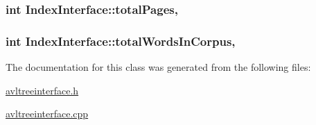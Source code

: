 \subsubsection[{total\+Pages}]{\setlength{\rightskip}{0pt plus 5cm}int Index\+Interface\+::total\+Pages\hspace{0.3cm}{\ttfamily [protected]}, {\ttfamily [inherited]}}\label{class_index_interface_a2df695d2b504f2e53a0bfdd6bfee31da}
\hypertarget{class_index_interface_ab607b430e78528cdb8bb79ba4afa91d2}{}
\subsubsection[{total\+Words\+In\+Corpus}]{\setlength{\rightskip}{0pt plus 5cm}int Index\+Interface\+::total\+Words\+In\+Corpus\hspace{0.3cm}{\ttfamily [protected]}, {\ttfamily [inherited]}}\label{class_index_interface_ab607b430e78528cdb8bb79ba4afa91d2}


The documentation for this class was generated from the following files\+:\begin{DoxyCompactItemize}
\item 
\hyperlink{avltreeinterface_8h}{avltreeinterface.\+h}\item 
\hyperlink{avltreeinterface_8cpp}{avltreeinterface.\+cpp}\end{DoxyCompactItemize}
